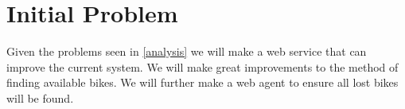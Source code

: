 \section{Initial Problem}
Given the problems seen in \ref{analysis} we will make a web service that can improve the current system. We will make great improvements to the method of finding available bikes.
We will further make a web agent to ensure all lost bikes will be found.